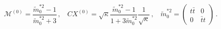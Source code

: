 \begin{equation}
\mathcal{M}^{(0)}={\frac{\tilde{m}_{0}^{\ast 2}-1}{{\tilde{m}}_{0}^{\ast 2}+3%
}}\,,~~~~CX^{(0)}=\sqrt{\kappa }{\frac{\tilde{m}_{0}^{\ast 2}-1}{1+3{\tilde{m%
}}_{0}^{\ast 2}}}{\frac{1}{\sqrt{\kappa }}}\,,~~~~\tilde{m}_{0}^{\ast
2}=\left( 
\begin{array}{cc}
t\bar{t} & 0 \\ 
0 & \bar{t}t
\end{array}
\right) \,.
\end{equation}


